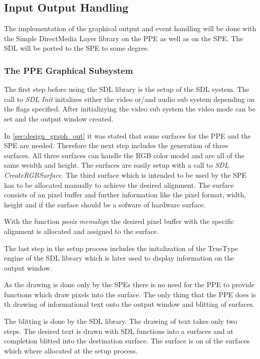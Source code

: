 \documentclass[DIV10, abstracton, openright, footsepline, headsepline, twoside, 9pt,
bigheadings]{scrreprt}
\begin{document}
\subsection{Input Output Handling}
\label{sec:impl_iohandling}

The implementation of the graphical output and event handling will be done with
the Simple DirectMedia Layer library on the PPE as well as on the SPE. The SDL
will be ported to the SPE to some degree.


\subsubsection{The PPE Graphical Subsystem}
\label{sec:impl_ppe_graphical_subsystem}

The first step before using the SDL library is the setup of the SDL system. The call
to \textit{SDL Init} initalizes either the video or/and audio sub system depending
on the flags specified. After initializying the video sub system the video mode can
be set and the output window created.

In \ref{sec:design_graph_out} it was stated that some surfaces for the PPE
and the SPE are needed. Therefore the next step includes the generation of three surfaces.
All three surfaces can handle the RGB color model and are all of the same weidth and
height. The surfaces are easily setup with a call to \textit{SDL CreateRGBSurface}.
The third surface which is intended to be used by the SPE has to be allocated manually
to achieve the desired alignment. The surface consists of an pixel buffer and further
information like the pixel format, width, height and if the surface should be a
sofware of  hardware surface.

With the function \textit{posix memalign} the desired pixel buffer with the specific
alignment is allocated and assigned to the surface.

The last step in the setup process includes the initalization of the TrueType engine
of the SDL library which is later used to display information on the output window.

As the drawing is done only by the SPEs there is no need for the PPE to provide
functions which draw pixels into the surface. The only thing that the PPE does
is th drawing of informational text onto the output window and blitting of surfaces.

The blitting is done by the SDL library. The drawing of text takes only two steps.
The desired text is drawn with SDL functions into a surfaces and at completion
blitted into the destination surface. The surface is on of the surfaces which where
allocated at the setup process.
\end{document}
